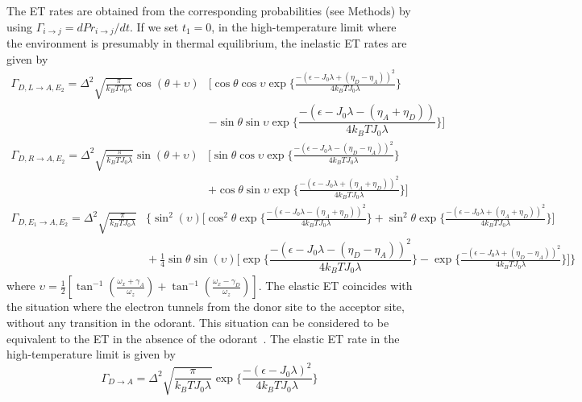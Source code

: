 \documentclass[aps,prl,tightenlines,onecolumn,superscriptaddress]{revtex4}
\begin{document}
\noindent The ET rates are obtained from the corresponding probabilities (see Methods) by using $\Gamma_{i\rightarrow j}=dPr_{i\rightarrow j}/dt$. If we set $t_{1}=0$, in the high-temperature limit where the environment is presumably in thermal equilibrium, the inelastic ET rates are given by
\begin{align}\label{L2}
\Gamma_{{D,L\rightarrow A,E_{2}}}=\Delta^{2}\sqrt{\frac{\pi}{k_{B}TJ_{0}\lambda}}\cos(\theta+\upsilon)&\Big[\cos\theta\cos\upsilon  \exp\Big\{\frac{-(\epsilon-J_{0}\lambda+(\eta_{D}-\eta_{A}))^{2}}{4k_{B}TJ_{0}\lambda}\Big\}\nonumber \\
&-\sin\theta\sin\upsilon\exp\Big\{\dfrac{-(\epsilon-J_{0}\lambda-(\eta_{A}+\eta_{D}))}{4k_{B}TJ_{0}\lambda}\Big\}\Big]
\end{align}
\begin{align}\label{R2}
\Gamma_{{D,R\rightarrow A,E_{2}}}=\Delta^{2}\sqrt{\frac{\pi}{k_{B}TJ_{0}\lambda}}\sin(\theta+\upsilon)&\Big[\sin\theta\cos\upsilon  \exp\Big\{\frac{-(\epsilon-J_{0}\lambda-(\eta_{D}-\eta_{A}))^{2}}{4k_{B}TJ_{0}\lambda}\Big\}\nonumber \\
&+\cos\theta\sin\upsilon\exp\Big\{\frac{-(\epsilon-J_{0}\lambda+(\eta_{A}+\eta_{D}))^{2}}{4k_{B}TJ_{0}\lambda}\Big\}\Big]
 \end{align}
 \begin{align}\label{12}
 \Gamma_{{D,E_{1}\rightarrow A,E_{2}}}=\Delta^{2}\sqrt{\frac{\pi}{k_{B}TJ_{0}\lambda}}&\Bigg\{\sin^{2}(\upsilon)\Big[\cos^{2}\theta  \exp\Big\{\frac{-(\epsilon-J_{0}\lambda-(\eta_{A}+\eta_{D}))^{2}}{4k_{B}TJ_{0}\lambda}\Big\}+\sin^{2}\theta
 \exp\Big\{\frac{-(\epsilon-J_{0}\lambda+(\eta_{A}+\eta_{D}))^{2}}{4k_{B}TJ_{0}\lambda}\Big\}\Big]\nonumber\\
 &\!\!\!\!\!\!\!\!\!\!\!\!+\frac{1}{4}\sin\theta\sin(\upsilon)\Big[\exp\Big\{\dfrac{-(\epsilon-J_{0}\lambda-(\eta_{D}-\eta_{A}))^{2}}{4k_{B}TJ_{0}\lambda}\Big\}- \exp\Big\{\frac{-(\epsilon-J_{0}\lambda+(\eta_{D}-\eta_{A}))^{2}}{4k_{B}TJ_{0}\lambda}\Big\}\Big]\Bigg\}
\end{align}
where $\upsilon=\frac{1}{2}[\tan^{-1}(\frac{\omega_{x}+\gamma_{A}}{\omega_{z}})+\tan^{-1}(\frac{\omega_{x}-\gamma_{D}}{\omega_{z}})]$. The elastic ET coincides with the situation where the electron tunnels from the donor site to the acceptor site, without any transition in the odorant. This situation can be considered to be equivalent to the ET in the absence of the odorant~\cite{Che}. The elastic ET rate in the high-temperature limit is given by
\begin{equation}\label{DA}
\Gamma_{{D\rightarrow A}}=\Delta^{2}\sqrt{\dfrac{\pi}{k_{B}TJ_{0}\lambda}} \exp\Big\{\dfrac{-(\epsilon-J_{0}\lambda)^{2}}{4k_{B}TJ_{0}\lambda}\Big\}
\end{equation}
\end{document}
